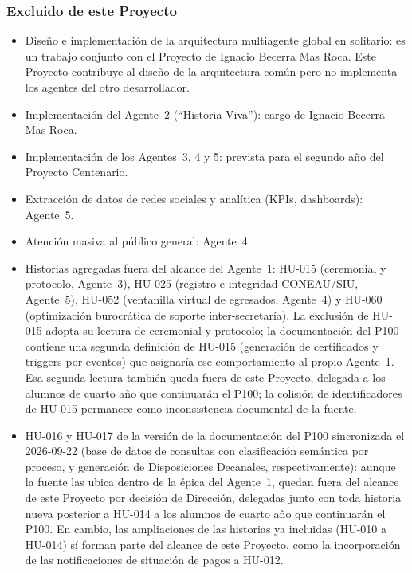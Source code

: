 \documentclass[a4paper, 12pt]{article}
\begin{document}
\subsubsection{Excluido de este Proyecto}

\begin{itemize}
  \item Dise\~no e implementaci\'on de la arquitectura multiagente global en solitario: es un trabajo conjunto con el Proyecto de Ignacio Becerra Mas Roca. Este Proyecto contribuye al dise\~no de la arquitectura com\'un pero no implementa los agentes del otro desarrollador.
  \item Implementaci\'on del Agente~2 (``Historia Viva''): cargo de Ignacio Becerra Mas Roca.
  \item Implementaci\'on de los Agentes~3, 4 y 5: prevista para el segundo a\~no del Proyecto Centenario.
  \item Extracci\'on de datos de redes sociales y anal\'itica (\acp{KPI}, dashboards): Agente~5.
  \item Atenci\'on masiva al p\'ublico general: Agente~4.
  \item Historias agregadas fuera del alcance del Agente~1: HU-015 (ceremonial y protocolo, Agente~3), HU-025 (registro e integridad CONEAU/SIU, Agente~5), HU-052 (ventanilla virtual de egresados, Agente~4) y HU-060 (optimizaci\'on burocr\'atica de soporte inter-secretar\'ia). La exclusi\'on de HU-015 adopta su lectura de ceremonial y protocolo; la documentaci\'on del \ac{P100} contiene una segunda definici\'on de HU-015 (generaci\'on de certificados y triggers por eventos) que asignar\'ia ese comportamiento al propio Agente~1. Esa segunda lectura tambi\'en queda fuera de este Proyecto, delegada a los alumnos de cuarto a\~no que continuar\'an el \ac{P100}; la colisi\'on de identificadores de HU-015 permanece como inconsistencia documental de la fuente.
  \item HU-016 y HU-017 de la versi\'on de la documentaci\'on del \ac{P100} sincronizada el 2026-09-22 (base de datos de consultas con clasificaci\'on sem\'antica por proceso, y generaci\'on de Disposiciones Decanales, respectivamente): aunque la fuente las ubica dentro de la \'epica del Agente~1, quedan fuera del alcance de este Proyecto por decisi\'on de Direcci\'on, delegadas junto con toda historia nueva posterior a HU-014 a los alumnos de cuarto a\~no que continuar\'an el \ac{P100}. En cambio, las ampliaciones de las historias ya incluidas (HU-010 a HU-014) s\'i forman parte del alcance de este Proyecto, como la incorporaci\'on de las notificaciones de situaci\'on de pagos a HU-012.

\end{itemize}
\end{document}
